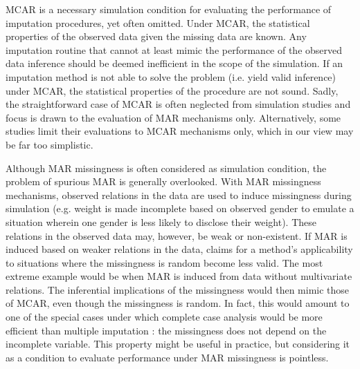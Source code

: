 \documentclass[bimj,fleqn]{w-art}
\begin{document}



MCAR is a necessary simulation condition for evaluating the performance of imputation procedures, yet often omitted. Under MCAR, the statistical properties of the observed data given the missing data are known. Any imputation routine that cannot at least mimic the performance of the observed data inference should be deemed inefficient in the scope of the simulation. If an imputation method is not able to solve the problem (i.e. yield valid inference) under MCAR, the statistical properties of the procedure are not sound. Sadly, the straightforward case of MCAR is often neglected from simulation studies and focus is drawn to the evaluation of MAR mechanisms only. Alternatively, some studies limit their evaluations to MCAR mechanisms only, which in our view may be far too simplistic. 

Although MAR missingness is often considered as simulation condition, the problem of spurious MAR is generally overlooked. With MAR missingness mechanisms, observed relations in the data are used to induce missingness during simulation (e.g. weight is made incomplete based on observed gender to emulate a situation wherein one gender is less likely to disclose their weight). These relations in the observed data may, however, be weak or non-existent. If MAR is induced based on weaker relations in the data, claims for a method's applicability to situations where the missingness is random become less valid. The most extreme example would be when MAR is induced from data without multivariate relations. The inferential implications of the missingness would then mimic those of MCAR, even though the missingness is random. In fact, this would amount to one of the special cases under which complete case analysis would be more efficient than multiple imputation \citep[see e.g.][p. 48]{fimd}: the missingness does not depend on the incomplete variable. This property might be useful in practice, but considering it as a condition to evaluate performance under MAR missingness is pointless. 
\end{document}
